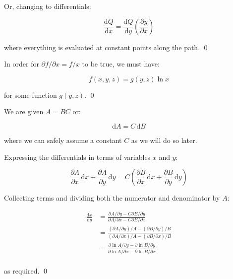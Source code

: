 \documentclass[12pt]{article}
\begin{document}
Or, changing to differentials:

\begin{equation}
    \frac{\mathrm{d}Q}{\mathrm{d}x} = \frac{\mathrm{d}Q}{\mathrm{d}y} \left( \frac{\partial y}{\partial x} \right)
\end{equation}

where everything is evaluated at constant points along the path.
\qed


In order for $\partial f/\partial x = f/x$ to be true, we must have:

\begin{equation}
    f(x, y, z) = g(y, z) \ln{x}
\end{equation}

for some function $g(y, z)$.
\qed


We are given $A = BC$ or:

\begin{equation}
    \mathrm{d}A = C \, \mathrm{d}B
\end{equation}

where we can safely assume a constant $C$ as we will do so later.

Expressing the differentials in terms of variables $x$ and $y$:

\begin{equation}
    \frac{\partial A}{\partial x} \, \mathrm{d}x + \frac{\partial A}{\partial y} \, \mathrm{d}y = C \left( \frac{\partial B}{\partial x} \, \mathrm{d}x + \frac{\partial B}{\partial y} \, \mathrm{d}y \right)
\end{equation}

Collecting terms and dividing both the numerator and denominator by $A$:

\begin{equation}
\begin{split}
    \frac{\mathrm{d}x}{\mathrm{d}y} &= \frac{\partial A/\partial y - C \partial B/\partial y}{\partial A/\partial x - C \partial B/\partial x} \\
    &= \frac{(\partial A/\partial y)/A - (\partial B/\partial y)/B}{(\partial A/\partial x)/A - (\partial B/\partial x)/B} \\
    &= \frac{\partial \ln{A}/\partial y - \partial \ln{B}/\partial y}{\partial \ln{A}/\partial x - \partial \ln{B}/\partial x} \\
\end{split}
\end{equation}

as required.
\qed
\end{document}
